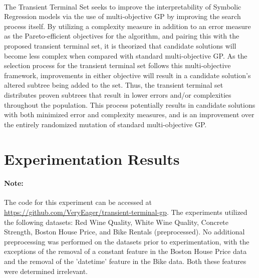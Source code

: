 \documentclass[a4paper]{article}
\begin{document}
\paragraph{} The Transient Terminal Set seeks to improve the interpretability of Symbolic Regression models via the use of multi-objective GP by improving the search process itself. By utilizing a complexity measure in addition to an error measure as the Pareto-efficient objectives for the algorithm, and pairing this with the proposed transient terminal set, it is theorized that candidate solutions will become less complex when compared with standard multi-objective GP. As the selection process for the transient terminal set follows this multi-objective framework, improvements in either objective will result in a candidate solution's altered subtree being added to the set. Thus, the transient terminal set distributes proven subtrees that result in lower errors and/or complexities throughout the population. This process potentially results in candidate solutions with both minimized error and complexity measures, and is an improvement over the entirely randomized mutation of standard multi-objective GP.

\section{Experimentation Results}
\paragraph{Note:} The code for this experiment can be accessed at \url{https://github.com/VeryEager/transient-terminal-gp}. The experiments utilized the following datasets: Red Wine Quality, White Wine Quality, Concrete Strength, Boston House Price, and Bike Rentals (preprocessed). No additional preprocessing was performed on the datasets prior to experimentation, with the exceptions of the removal of a constant feature in the Boston House Price data and the removal of the 'datetime' feature in the Bike data. Both these features were determined irrelevant.
\end{document}
